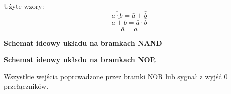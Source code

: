 \documentclass[12pt,a4paper]{report}
\begin{document}
	Użyte wzory:
	\begin{equation}
	\overline{a\cdot b}=\bar{a}+\bar{b}
	\end{equation}
	\begin{equation}
	\overline{a+b}=\bar{a}\cdot\bar{b}
	\end{equation}
	\begin{equation}
	\bar{\bar{a}}=a
	\end{equation}
	
	{\large\bfseries Schemat ideowy układu na bramkach NAND}
	\vspace{0.5cm}
	\begin{center}
	\end{center}
	
	{\large\bfseries Schemat ideowy układu na bramkach NOR}
	\vspace{0.5cm}
	\begin{center}
	\end{center}
	Wszystkie wejścia poprowadzone przez bramki NOR lub sygnał z wyjść 0 przełączników. 
	
	
	
	
\end{document}
